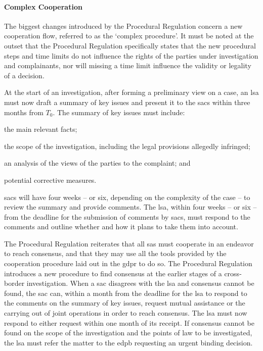 \paragraph{Complex Cooperation}
The biggest changes introduced by the Procedural Regulation concern a new cooperation flow, referred to as the `complex procedure'. 
It must be noted at the outset that the Procedural Regulation specifically states that the new procedural steps and time limits do not influence the rights of the parties under investigation and complainants,\autocite[7]{ProceduralRegulation} nor will missing a time limit influence the validity or legality of a decision.\autocite[14]{ProceduralRegulation}

At the start of an investigation, after forming a preliminary view on a case, an \gls{lsa} must now draft a summary of key issues and present it to the \glspl{sac} within three months from $T_0$.\autocite[10(1), (3)]{ProceduralRegulation}
The summary of key issues must include:
\begin{enumerate*}[label=(\roman*)]
    \item the main relevant facts;
    \item the scope of the investigation, including the legal provisions allegedly infringed;
    \item an analysis of the views of the parties to the complaint; and
    \item potential corrective measures.
\end{enumerate*}\autocite[10(2)]{ProceduralRegulation}
\glspl{sac} will have four weeks -- or six, depending on the complexity of the case -- to review the summary and provide comments.\autocite[10(4)]{ProceduralRegulation}
The \gls{lsa}, within four weeks -- or six -- from the deadline for the submission of comments by \glspl{sac}, must respond to the comments and outline whether and how it plans to take them into account.\autocite[10(5)]{ProceduralRegulation}

The Procedural Regulation reiterates that all \glspl{sa} must cooperate in an endeavor to reach consensus, and that they may use all the tools provided by the cooperation procedure laid out in the \gls{gdpr} to do so.\autocite[11(1)]{ProceduralRegulation}
The Procedural Regulation introduces a new procedure to find consensus at the earlier stages of a cross-border investigation.
When a \gls{sac} disagrees with the \gls{lsa} and consensus cannot be found, the \gls{sac} can, within a month from the deadline for the \gls{lsa} to respond to the comments on the summary of key issues,\autocite[11(3)]{ProceduralRegulation} request mutual assistance or the carrying out of joint operations in order to reach consensus.
The \gls{lsa} must now respond to either request within one month of its receipt.\autocite[11(4)]{ProceduralRegulation}
If consensus cannot be found on the scope of the investigation and the points of law to be investigated, the \gls{lsa} must refer the matter to the \gls{edpb} requesting an urgent binding decision.\autocite[11(6)]{ProceduralRegulation}

